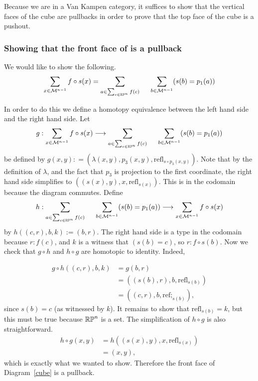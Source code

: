 \documentclass{amsart}
\begin{document}
Because we are in a Van Kampen category, it suffices to show that the vertical faces of the cube are pullbacks in order to prove that the top face of the cube is a pushout. 

\subsubsection{Showing that the front face of is a pullback}
 We would like to show the following.
 \[
 \displaystyle\sum_{x \in \mathcal{M}^{n-1}} f\circ s (x) = \displaystyle\sum_{a \in \sum_{c \in \mathbb{RP}^n}f(c)} \hspace {0.5cm}\displaystyle\sum_{b \in \mathcal{M}^{n-1}} (s(b) =p_1(a))
 \]
 
 In order to do this we define a homotopy equivalence between the left hand side and the right hand side. Let
 \[
 g:  \displaystyle\sum_{x \in \mathcal{M}^{n-1}} f\circ s (x) \longrightarrow \displaystyle\sum_{a \in \sum_{c \in \mathbb{RP}^n}f(c)} \hspace {0.5cm}\displaystyle\sum_{b \in \mathcal{M}^{n-1}} (s(b) =p_1(a))
 \]
 be defined by $g (x, y) : = (\lambda(x, y), p_3(x, y), \text{refl}_{s\circ p_3(x,y)})$. Note that by the definition of $\lambda$, and the fact that $p_3$ is projection to the first coordinate, the right hand side simplifies to $((s(x), y), x, \text{refl}_{s(x)})$. This is in the codomain because the diagram commutes. Define
  \[
 h: \displaystyle\sum_{a \in \sum_{c \in \mathbb{RP}^n}f(c)} \hspace {0.5cm}\displaystyle\sum_{b \in \mathcal{M}^{n-1}} (s(b) =p_1(a)) \longrightarrow  \displaystyle\sum_{x \in \mathcal{M}^{n-1}} f\circ s (x) 
 \]
by $h((c,r), b, k) := (b, r)$. The right hand side is a type in the codomain because $r : f(c)$, and $k$ is a witness that $(s(b)=c)$, so $r: f \circ s(b)$. Now we check that  $g\circ h$ and $h \circ g$ are homotopic to identity. Indeed,

\begin{align*}
g \circ h((c, r), b, k)	& = g(b, r) \\
				& = ((s(b), r), b, \text{refl}_{s(b)})\\
				& = ((c,r), b, \text{ref;}_{s(b)}),
\end{align*}
since $s(b) = c$ (as witnessed by $k$). It remains to show that $\text{refl}_{s(b)}=k$, but this must be true because $\mathbb{RP}^n$ is a set. The simplification of $h \circ g$ is also straightforward.
\begin{align*}
h \circ g (x, y)	& = h((s(x), y), x, \text{refl}_{s(x)})\\
			& = (x, y),
\end{align*}
which is exactly what we wanted to show.  Therefore the front face of Diagram~\ref{cube} is a pullback.
\end{document}
